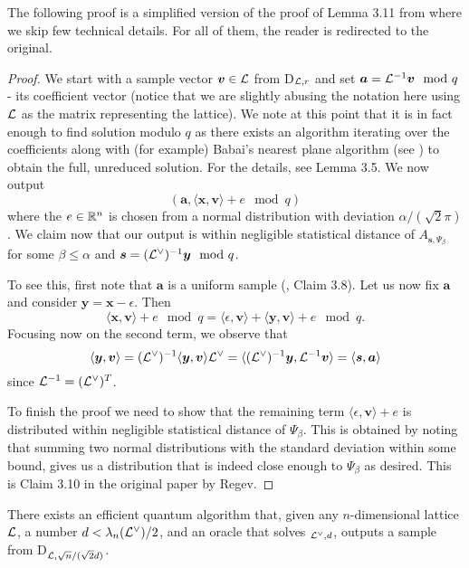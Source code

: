 The following proof is a simplified version of the proof of Lemma 3.11 from \cite{regev} where we skip few technical details. For all of them, the reader is redirected to the original.
\begin{proof}
	We start with a sample vector $\boldsymbol{v} \in \mathcal{L}$ from D$_{\mathcal{L}, r}$ and set $\boldsymbol{a} = \mathcal{L}^{-1} \boldsymbol{v} \mod q$ - its coefficient vector (notice that we are slightly abusing the notation here using $\mathcal{L}$ as the matrix representing the lattice). We note at this point that it is in fact enough to find solution modulo $q$ as there exists an algorithm iterating over the coefficients along with (for example) Babai's nearest plane algorithm (see \cite{babai}) to obtain the full, unreduced solution. For the details, see \cite{regev} Lemma 3.5. We now output
	\begin{equation} (\bm{a}, \langle \bm{x}, \bm{v} \rangle + e \mod q) \end{equation}
	where the $e \in \mathbb{R}^n$ is chosen from a normal distribution with deviation $\alpha/(\sqrt{2} \pi)$. We claim now that our output is within negligible statistical distance of $A_{\bm{s}, \Psi_{\beta}}$ for some $\beta \leq \alpha$ and $\boldsymbol{s} = (\mathcal{L}^{\vee})^{-1}\boldsymbol{y} \mod q$.

	To see this, first note that $\bm{a}$ is a uniform sample (\cite{regev}, Claim 3.8). Let us now fix $\bm{a}$ and consider $\bm{y} = \bm{x} - \epsilon$. Then
	\[ \langle \bm{x}, \bm{v} \rangle + e \mod q = \langle \epsilon, \bm{v} \rangle + \langle \bm{y}, \bm{v} \rangle + e \mod q. \]
Focusing now on the second term, we observe that
\[ \langle \boldsymbol{y}, \boldsymbol{v} \rangle = (\mathcal{L}^{\vee})^{-1} \langle \boldsymbol{y}, \boldsymbol{v} \rangle \mathcal{L}^{\vee} =  \langle (\mathcal{L}^{\vee})^{-1}\boldsymbol{y}, \mathcal{L}^{-1} \boldsymbol{v} \rangle = \langle \boldsymbol{s}, \boldsymbol{a} \rangle \]
since $\mathcal{L}^{-1} = (\mathcal{L}^{\vee})^T$.

To finish the proof we need to show that the remaining term $\langle \epsilon, \bm{v} \rangle + e$ is distributed within negligible statistical distance of $\Psi_{\beta}$. This is obtained by noting that summing two normal distributions with the standard deviation within some bound, gives us a distribution that is indeed close enough to $\Psi_{\beta}$ as desired. This is Claim 3.10 in the original paper by Regev.
\end{proof}
\begin{proposition}\label{quantum}
	There exists an efficient quantum algorithm that, given any $n$-dimensional lattice $\mathcal{L}$, a number $d < \lambda_n (\mathcal{L}^{\vee})/2$, and an oracle that solves $_{\mathcal{L}^{\vee},d}$, outputs a sample from D$_{\mathcal{L},\sqrt{n}/(\sqrt{2}d)}$.
\end{proposition}

